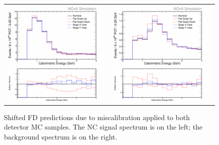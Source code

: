 \begin{figure}[p]
  \centering
  \begin{tabular}{c c}
    \includegraphics[width=.47\textwidth]{figures/Systs/cNCEXCalibAbsSysts.png} &
    \includegraphics[width=.47\linewidth]{figures/Systs/cBGEXCalibAbsSysts.png} \\
  \end{tabular}
  \caption[Shifted FD Predictions Due to Miscalibration at Both Detectors]{Shifted FD predictions due to miscalibration applied to both detector MC samples. The NC signal spectrum is on the left; the background spectrum is on the right.}
  \label{fig:SystCalibAbs}
\end{figure}

